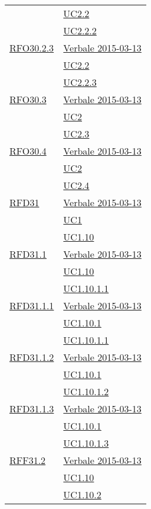\begin{longtable}{|>{\centering}m{5cm}|m{5cm}<{\centering}|}
& \hyperref[UC2.2]{UC2.2}\\
& \hyperref[UC2.2.2]{UC2.2.2}\\ \hline
\hyperlink{RFO30.2.3}{RFO30.2.3} & \hyperlink{Verbale 2015-03-13}{Verbale 2015-03-13}\\
& \hyperref[UC2.2]{UC2.2}\\
& \hyperref[UC2.2.3]{UC2.2.3}\\ \hline
\hyperlink{RFO30.3}{RFO30.3} & \hyperlink{Verbale 2015-03-13}{Verbale 2015-03-13}\\
& \hyperref[UC2]{UC2}\\
& \hyperref[UC2.3]{UC2.3}\\ \hline
\hyperlink{RFO30.4}{RFO30.4} & \hyperlink{Verbale 2015-03-13}{Verbale 2015-03-13}\\
& \hyperref[UC2]{UC2}\\
& \hyperref[UC2.4]{UC2.4}\\ \hline
\hyperlink{RFD31}{RFD31} & \hyperlink{Verbale 2015-03-13}{Verbale 2015-03-13}\\
& \hyperref[UC1]{UC1}\\
& \hyperref[UC1.10]{UC1.10}\\ \hline
\hyperlink{RFD31.1}{RFD31.1} & \hyperlink{Verbale 2015-03-13}{Verbale 2015-03-13}\\
& \hyperref[UC1.10]{UC1.10}\\
& \hyperref[UC1.10.1.1]{UC1.10.1.1}\\ \hline
\hyperlink{RFD31.1.1}{RFD31.1.1} & \hyperlink{Verbale 2015-03-13}{Verbale 2015-03-13}\\
& \hyperref[UC1.10.1]{UC1.10.1}\\
& \hyperref[UC1.10.1.1]{UC1.10.1.1}\\ \hline
\hyperlink{RFD31.1.2}{RFD31.1.2} & \hyperlink{Verbale 2015-03-13}{Verbale 2015-03-13}\\
& \hyperref[UC1.10.1]{UC1.10.1}\\
& \hyperref[UC1.10.1.2]{UC1.10.1.2}\\ \hline
\hyperlink{RFD31.1.3}{RFD31.1.3} & \hyperlink{Verbale 2015-03-13}{Verbale 2015-03-13}\\
& \hyperref[UC1.10.1]{UC1.10.1}\\
& \hyperref[UC1.10.1.3]{UC1.10.1.3}\\ \hline
\hyperlink{RFF31.2}{RFF31.2} & \hyperlink{Verbale 2015-03-13}{Verbale 2015-03-13}\\
& \hyperref[UC1.10]{UC1.10}\\
& \hyperref[UC1.10.2]{UC1.10.2}\\ \hline

\end{longtable}
